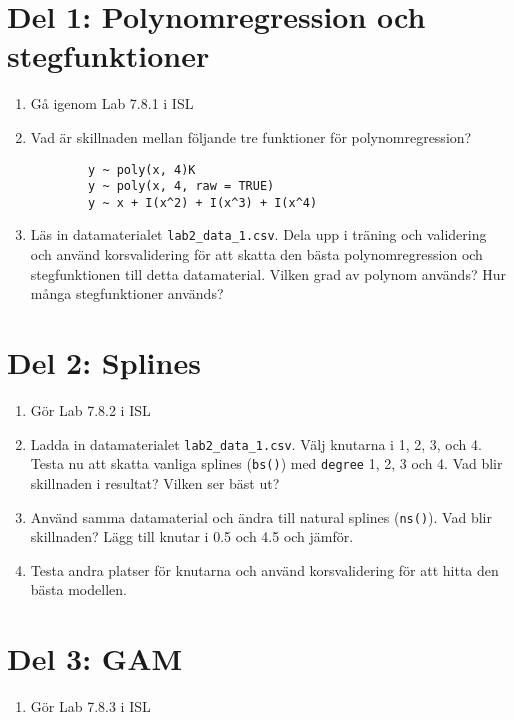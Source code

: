 \documentclass[a4paper]{article}
\begin{document}
\section*{Del 1: Polynomregression och stegfunktioner}

\begin{enumerate}
    \item Gå igenom Lab 7.8.1 i ISL
    \item Vad är skillnaden mellan följande tre funktioner för polynomregression?
    \begin{verbatim}
        y ~ poly(x, 4)K
        y ~ poly(x, 4, raw = TRUE)
        y ~ x + I(x^2) + I(x^3) + I(x^4)
    \end{verbatim}
    \item Läs in datamaterialet \texttt{lab2\_data\_1.csv}. Dela upp i träning och validering och använd korsvalidering för att skatta den bästa polynomregression och stegfunktionen till detta datamaterial. Vilken grad av polynom används? Hur många stegfunktioner används?
\end{enumerate}

\section*{Del 2: Splines}

\begin{enumerate}
    \item Gör Lab 7.8.2 i ISL
    \item Ladda in datamaterialet \texttt{lab2\_data\_1.csv}. Välj knutarna i 1, 2, 3, och 4. Testa nu att skatta vanliga splines (\texttt{bs()}) med \texttt{degree} 1, 2, 3 och 4. Vad blir skillnaden i resultat? Vilken ser bäst ut?
    \item Använd samma datamaterial och ändra till natural splines (\texttt{ns()}). Vad blir skillnaden? Lägg till knutar i 0.5 och 4.5 och jämför.
    \item Testa andra platser för knutarna och använd korsvalidering för att hitta den bästa modellen.
\end{enumerate}

\section*{Del 3: GAM}
\begin{enumerate}
    \item Gör Lab 7.8.3 i ISL
\end{enumerate}
\end{document}
